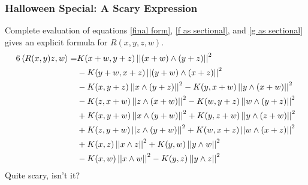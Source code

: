 \begin{frame}
\frametitle{Halloween Special: A Scary Expression}
Complete evaluation of equations \ref{final form}, \ref{f as sectional}, and \ref{g as sectional} gives an explicit formula for $R(x,y,z,w)$.
\pause
{\footnotesize
\begin{align*}
6\inner{R(x,y)z,w}=&K(x+w,y+z)\norm{(x+w)\wedge (y+z)}^2\\
&-K(y+w,x+z)\norm{(y+w)\wedge (x+z)}^2\\
&-K(x,y+z)\norm{x\wedge (y+z)}^2-K(y,x+w)\norm{y\wedge (x+w)}^2\\
&-K(z,x+w)\norm{z\wedge (x+w)}^2-K(w,y+z)\norm{w\wedge (y+z)}^2\\
&+K(x,y+w)\norm{x\wedge (y+w)}^2+K(y,z+w)\norm{y\wedge (z+w)}^2\\
&+K(z,y+w)\norm{z\wedge (y+w)}^2+K(w,x+z)\norm{w\wedge (x+z)}^2\\
&+K(x,z)\norm{x\wedge z}^2+K(y,w)\norm{y\wedge w}^2\\ 
&-K(x,w)\norm{x\wedge w}^2-K(y,z)\norm{y\wedge z}^2\\ 
\end{align*}
}%
Quite scary, isn't it?
\end{frame}
